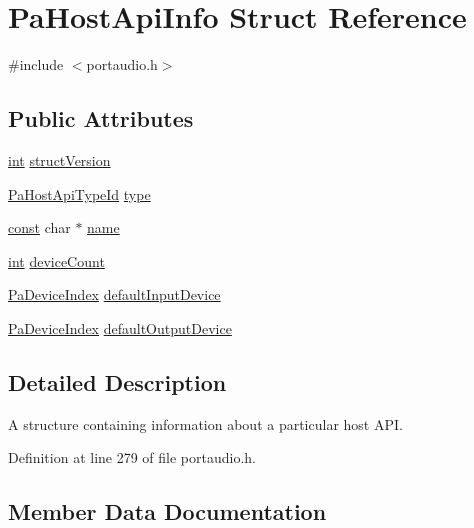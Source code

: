 \hypertarget{struct_pa_host_api_info}{}\section{Pa\+Host\+Api\+Info Struct Reference}
\label{struct_pa_host_api_info}


{\ttfamily \#include $<$portaudio.\+h$>$}

\subsection*{Public Attributes}
\begin{DoxyCompactItemize}
\item 
\hyperlink{xmltok_8h_a5a0d4a5641ce434f1d23533f2b2e6653}{int} \hyperlink{struct_pa_host_api_info_a1f3a8c465488e7af8024237256d80c14}{struct\+Version}
\item 
\hyperlink{portaudio_8h_a8eaebe3d39c5ea45598da8f86dc2e5ae}{Pa\+Host\+Api\+Type\+Id} \hyperlink{struct_pa_host_api_info_a5424bfcdf9f73b17cddc89e827a45d3f}{type}
\item 
\hyperlink{getopt1_8c_a2c212835823e3c54a8ab6d95c652660e}{const} char $\ast$ \hyperlink{struct_pa_host_api_info_a78afe5d557543c82cd9773229e25a8ec}{name}
\item 
\hyperlink{xmltok_8h_a5a0d4a5641ce434f1d23533f2b2e6653}{int} \hyperlink{struct_pa_host_api_info_a44e3adfaba0117a6780e2493468c96b1}{device\+Count}
\item 
\hyperlink{portaudio_8h_ad79317e65bde63d76c4b8e711ac5a361}{Pa\+Device\+Index} \hyperlink{struct_pa_host_api_info_a85a62057c3479d3efaa477d8562cf21d}{default\+Input\+Device}
\item 
\hyperlink{portaudio_8h_ad79317e65bde63d76c4b8e711ac5a361}{Pa\+Device\+Index} \hyperlink{struct_pa_host_api_info_a62632690b5f7906d3c9bfdab91e7f4b2}{default\+Output\+Device}
\end{DoxyCompactItemize}


\subsection{Detailed Description}
A structure containing information about a particular host A\+PI. 

Definition at line 279 of file portaudio.\+h.



\subsection{Member Data Documentation}
